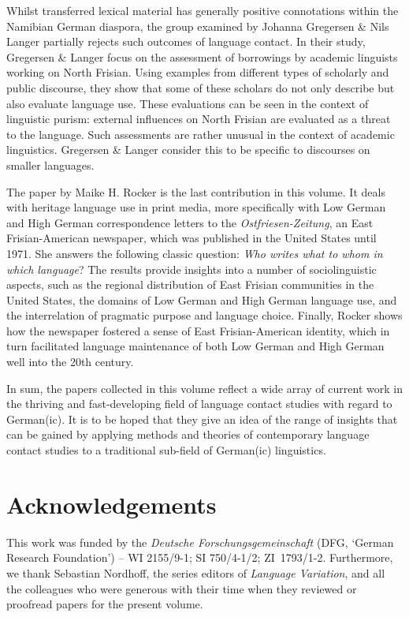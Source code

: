 \documentclass[output=paper]{langsci/langscibook}
\begin{document}
Whilst transferred lexical material has generally positive connotations within the Namibian German diaspora, the group examined by {Johanna} {Gregersen} {\&} {Nils} {Langer} partially rejects such outcomes of language contact. In their study, Gregersen \& Langer focus on the assessment of borrowings by academic linguists working on North Frisian. Using examples from different types of scholarly and public discourse, they show that some of these scholars do not only describe but also evaluate language use. These evaluations can be seen in the context of linguistic purism: external influences on North Frisian are evaluated as a threat to the language. Such assessments are rather unusual in the context of academic linguistics. Gregersen \& Langer consider this to be specific to discourses on smaller languages.

The paper by {Maike} {H.} {Rocker} is the last contribution in this volume. It deals with heritage language use in print media, more specifically with Low German and High German correspondence letters to the \textit{Ostfriesen-Zeitung}, an East Fri\-sian-American newspaper, which was published in the United States until 1971. She answers the following classic question: \textit{Who writes what to whom in which language}? The results provide insights into a number of sociolinguistic aspects, such as the regional distribution of East Frisian communities in the United States, the domains of Low German and High German language use, and the interrelation of pragmatic purpose and language choice. Finally, Rocker shows how the newspaper fostered a sense of East Frisian-American identity, which in turn facilitated language maintenance of both Low German and High German well into the 20th century.

In sum, the papers collected in this volume reflect a wide array of current work in the thriving and fast-developing field of language contact studies with regard to German(ic). It is to be hoped that they give an idea of the range of insights that can be gained by applying methods and theories of contemporary language contact studies to a traditional sub-field of German(ic) linguistics.

\section*{Acknowledgements}

This work was funded by the \textit{Deutsche Forschungsgemeinschaft} (DFG, ‘German Research Foundation’) – WI 2155/9-1; SI 750/4-1/2; ZI~1793/1-2. Furthermore, we thank Sebastian Nordhoff, the series editors of \textit{{Language Variation}}, and all the colleagues who were generous with their time when they reviewed or proofread papers for the present volume.

{\sloppy\printbibliography[heading=subbibliography,notkeyword=this]}
\end{document}
